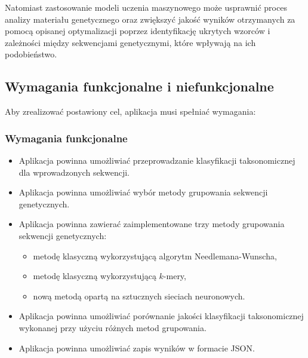         Natomiast zastosowanie modeli uczenia maszynowego może usprawnić proces analizy materiału genetycznego oraz zwiększyć jakość wyników otrzymanych za pomocą opisanej optymalizacji poprzez identyfikację ukrytych wzorców i zależności między sekwencjami genetycznymi, które wpływają na ich podobieństwo.


    \subsection{Wymagania funkcjonalne i niefunkcjonalne}

    Aby zrealizować postawiony cel, aplikacja musi spełniać wymagania:

        \subsubsection{Wymagania funkcjonalne}

            \begin{itemize}
                \item Aplikacja powinna umożliwiać przeprowadzanie klasyfikacji taksonomicznej dla wprowadzonych sekwencji.
                \item Aplikacja powinna umożliwiać wybór metody grupowania sekwencji genetycznych.
                \item {
                    Aplikacja powinna zawierać zaimplementowane trzy metody grupowania sekwencji genetycznych:
                    \begin{itemize}
                        \item {
                            metodę klasyczną wykorzystującą algorytm Needlemana-Wunscha,
                        }
                        \item {
                            metodę klasyczną wykorzystującą $k$-mery,
                        }
                        \item {
                            nową metodą opartą na sztucznych sieciach neuronowych.
                        }
                    \end{itemize}
                }
                \item Aplikacja powinna umożliwiać porównanie jakości klasyfikacji taksonomicznej wykonanej przy użyciu różnych metod grupowania.
                \item Aplikacja powinna umożliwiać zapis wyników w formacie JSON.
            \end{itemize}

